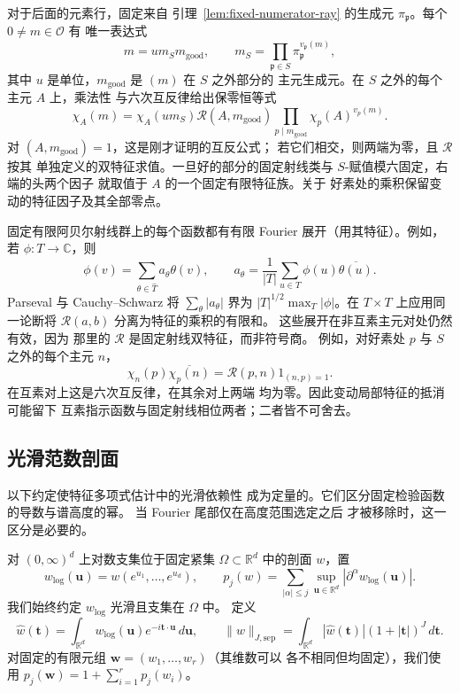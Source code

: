 对于后面的元素行，固定来自
引理~\ref{lem:fixed-numerator-ray} 的生成元 $\pi_{\mathfrak p}$。每个 $0\ne m\in\mathcal O$ 有
唯一表达式
\[
 m=u m_S m_{\mathrm{good}},\qquad
 m_S=\prod_{\mathfrak p\in S}\pi_{\mathfrak p}^{v_{\mathfrak p}(m)},
\]
其中 $u$ 是单位，$m_{\mathrm{good}}$ 是 $(m)$ 在 $S$ 之外部分的
主元生成元。在 $S$ 之外的每个主元 $A$ 上，乘法性
与六次互反律给出保零恒等式
\begin{equation}\label{eq:row-fixed-ray-reduction}
 \chi_A(m)=\chi_A(u m_S)\mathcal R(A,m_{\mathrm{good}})
       \prod_{p\mid m_{\mathrm{good}}}\chi_p(A)^{v_p(m)}.
\end{equation}
对 $(A,m_{\mathrm{good}})=1$，这是刚才证明的互反公式；
若它们相交，则两端为零，且 $\mathcal R$ 按其
单独定义的双特征求值。一旦好的部分的固定射线类与
$S$-赋值模六固定，右端的头两个因子
就取值于 $A$ 的一个固定有限特征族。关于
好素处的乘积保留变动的特征因子及其全部零点。

固定有限阿贝尔射线群上的每个函数都有有限 Fourier
展开（用其特征）。例如，若 $\phi:T\to\mathbb C$，则
\[
 \phi(v)=\sum_{\theta\in\widehat T}a_\theta\theta(v),\qquad
 a_\theta=\frac1{|T|}\sum_{u\in T}\phi(u)\overline{\theta(u)}.
\]
Parseval 与 Cauchy--Schwarz 将 $\sum_\theta|a_\theta|$ 界为
$|T|^{1/2}\max_T|\phi|$。在 $T\times T$ 上应用同一论断将
$\mathcal R(a,b)$ 分离为特征的乘积的有限和。
这些展开在非互素主元对处仍然有效，因为
那里的 $\mathcal R$ 是固定射线双特征，而非符号商。
例如，对好素处 $p$ 与 $S$ 之外的每个主元 $n$，
\[
 \chi_n(p)\overline{\chi_p(n)}
       =\mathcal R(p,n)1_{(n,p)=1}.
\]
在互素对上这是六次互反律，在其余对上两端
均为零。因此变动局部特征的抵消可能留下
互素指示函数与固定射线相位两者；二者皆不可舍去。

\subsection{光滑范数剖面}

以下约定使特征多项式估计中的光滑依赖性
成为定量的。它们区分固定检验函数的导数与谱高度的幂。
当 Fourier 尾部仅在高度范围选定之后
才被移除时，这一区分是必要的。

对 $(0,\infty)^d$ 上对数支集位于固定紧集
$\Omega\subset\mathbb R^d$ 中的剖面 $w$，置
\[
 w_{\log}(\boldsymbol u)=w(e^{u_1},\ldots,e^{u_d}),\qquad
 p_j(w)=\sum_{|\alpha|\le j}\sup_{\boldsymbol u\in\mathbb R^d}
                  |\partial^\alpha w_{\log}(\boldsymbol u)|.
\]
我们始终约定 $w_{\log}$ 光滑且支集在 $\Omega$ 中。
定义
\[
 \widehat w(\boldsymbol t)=\int_{\mathbb R^d}w_{\log}(\boldsymbol u)
                    e^{-i\boldsymbol t\cdot\boldsymbol u}\,d\boldsymbol u,
 \qquad
 \|w\|_{J,\mathrm{sep}}
 =\int_{\mathbb R^d}|\widehat w(\boldsymbol t)|
                    (1+|\boldsymbol t|)^J\,d\boldsymbol t.
\]
对固定的有限元组 $\boldsymbol w=(w_1,\ldots,w_r)$（其维数可以
各不相同但均固定），我们使用
$p_j(\boldsymbol w)=1+\sum_{i=1}^r p_j(w_i)$。

